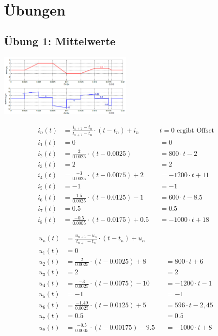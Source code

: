 \section{Übungen}
\subsection{Übung 1: Mittelwerte}\label{ueb1}
\begin{center}
\includegraphics[width = 0.5\textwidth]{bilder/a1}
\end{center}

\begin{minipage}[t]{0.49\textwidth}
\begin{align*}
	i_n(t)&= \frac{i_{n+1}-i_n}{t_{n+1}-t_n}\cdot (t-t_n)+i_n&&t=0\textrm{ ergibt Offset}\\
	i_1(t) &= 0&&=0\\
	i_2(t)&= \frac{2}{0.0025}\cdot (t-0.0025) &&= 800\cdot t-2\\
	i_3(t)&= 2&&=2\\
	i_4(t)&= \frac{-3}{0.0025}\cdot (t-0.0075) +2&&=-1200\cdot t+11\\
	i_5(t)&=-1&&=-1\\
	i_6(t)&=\frac{1.5}{0.0025}\cdot (t-0.0125)-1&&=600\cdot t -8.5\\
	i_7(t)&=0.5&&=0.5\\
	i_8(t)&=\frac{-0.5}{0.0005}\cdot (t-0.0175)+0.5&&=-1000\cdot t+18
\end{align*}
\end{minipage}\begin{minipage}[t]{0.49\textwidth}
\begin{align*}
	u_n(t)&= \frac{u_{n+1}-u_n}{t_{n+1}-t_n}\cdot (t-t_n)+u_n\\
	u_1(t)&= 0\\
	u_2(t)&= \frac{2}{0.0025}\cdot(t-0.0025)+8&&=800\cdot t+6\\
	u_3(t)&= 2&&=2\\
	u_4(t)&=\frac{-3}{0.0025}\cdot (t-0.0075)-10&&=-1200\cdot t-1\\
	u_5(t)&=-1&&=-1\\
	u_6(t)&=\frac{-1.49}{0.0025}\cdot (t-0.0125) +5&&=596\cdot t-2,45\\
	u_7(t)&=0.5&&=0.5\\
	u_8(t)&=\frac{-0.5}{0.0005}\cdot(t-0.00175)-9.5&&=-1000\cdot t+8
\end{align*}
\end{minipage}


